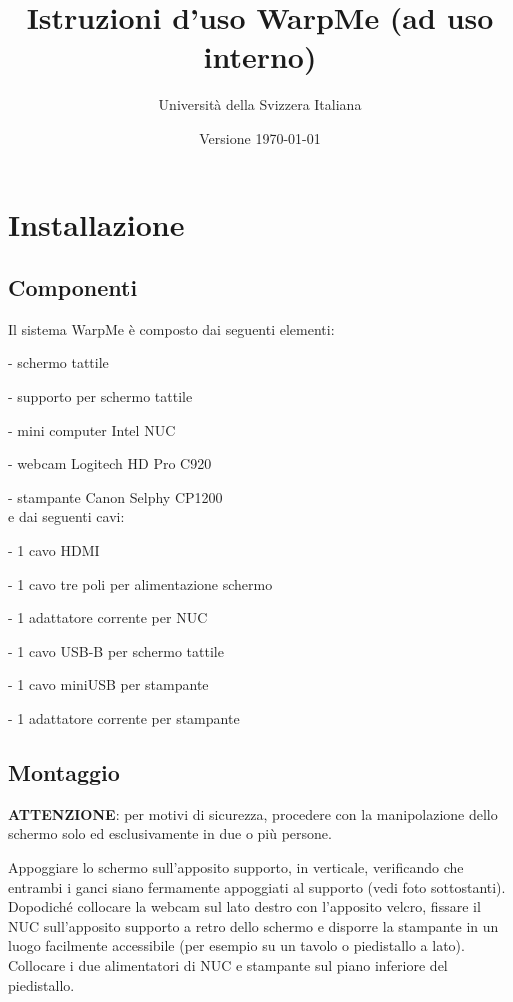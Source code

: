 \documentclass[12pt]{article}
\title{Istruzioni d'uso WarpMe (ad uso interno)}
\author{Università della Svizzera Italiana}
\date{Versione \today}
\begin{document}
\maketitle
\tableofcontents
\newpage


\section{Installazione}\label{installation}	

	\subsection{Componenti}
	
		Il sistema WarpMe è composto dai seguenti elementi:
		
		- schermo tattile
		
		- supporto per schermo tattile
		
		- mini computer Intel NUC
		
		- webcam Logitech HD Pro C920
		
		- stampante Canon Selphy CP1200\\
		
		e dai seguenti cavi:
		
		- 1 cavo HDMI
		
		- 1 cavo tre poli per alimentazione schermo
		
		- 1 adattatore corrente per NUC
		
		- 1 cavo USB-B per schermo tattile
		
		- 1 cavo miniUSB per stampante
		
		- 1 adattatore corrente per stampante
		
		
	\subsection{Montaggio}
	
		\textbf{ATTENZIONE}: per motivi di sicurezza, procedere con la manipolazione dello schermo solo ed esclusivamente in due o più persone.
		
		Appoggiare lo schermo sull'apposito supporto, in verticale, verificando che entrambi i ganci siano fermamente appoggiati al supporto (vedi foto sottostanti). Dopodiché collocare la webcam sul lato destro con l'apposito velcro, fissare il NUC sull'apposito supporto a retro dello schermo e disporre la stampante in un luogo facilmente accessibile (per esempio su un tavolo o piedistallo a lato). Collocare i due alimentatori di NUC e stampante sul piano inferiore del piedistallo.
		
\end{document}
